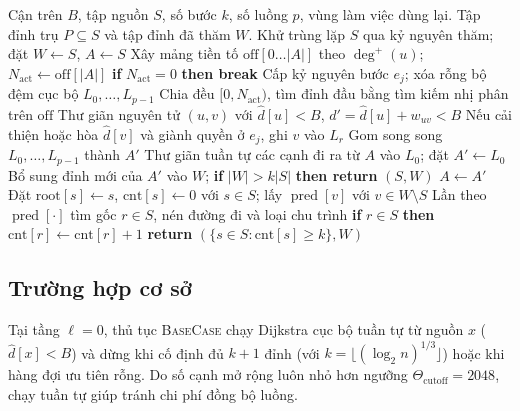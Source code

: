\begin{algorithm}[htbp]
\caption{Thủ tục tìm đỉnh trụ song song $\textsc{FindPivots}(B, S, k)$}
\label{alg:parallel_find_pivots}
\small\setlength{\baselineskip}{14pt}
\begin{algorithmic}[1]
\Require Cận trên $B$, tập nguồn $S$, số bước $k$, số luồng $p$, vùng làm việc dùng lại.
\Ensure Tập đỉnh trụ $P \subseteq S$ và tập đỉnh đã thăm $W$.
\State Khử trùng lặp $S$ qua kỷ nguyên thăm; đặt $W \leftarrow S$, $A \leftarrow S$
    \State Xây mảng tiền tố $\mathrm{off}[0\ldots|A|]$ theo $\deg^+(u)$; $N_{\mathrm{act}} \leftarrow \mathrm{off}[|A|]$
    \State \textbf{if} $N_{\mathrm{act}} = 0$ \textbf{then break}
    \State Cấp kỷ nguyên bước $e_j$; xóa rỗng bộ đệm cục bộ $L_0, \ldots, L_{p-1}$
            \State Chia đều $[0, N_{\mathrm{act}})$, tìm đỉnh đầu bằng tìm kiếm nhị phân trên $\mathrm{off}$
            \State Thư giãn nguyên tử $(u, v)$ với $\widehat{d}[u] < B$, $d' = \widehat{d}[u] + w_{uv} < B$
            \State Nếu cải thiện hoặc hòa $\widehat{d}[v]$ và giành quyền ở $e_j$, ghi $v$ vào $L_r$
        \EndFor
        \State Gom song song $L_0, \ldots, L_{p-1}$ thành $A'$
    \Else
        \State Thư giãn tuần tự các cạnh đi ra từ $A$ vào $L_0$; đặt $A' \leftarrow L_0$
    \EndIf
    \State Bổ sung đỉnh mới của $A'$ vào $W$; \textbf{if} $|W| > k|S|$ \textbf{then return} $(S, W)$
    \State $A \leftarrow A'$
\EndFor
\State Đặt $\mathrm{root}[s] \leftarrow s$, $\mathrm{cnt}[s] \leftarrow 0$ với $s \in S$; lấy $\operatorname{pred}[v]$ với $v \in W \setminus S$
 
    \State Lần theo $\operatorname{pred}[\cdot]$ tìm gốc $r \in S$, nén đường đi và loại chu trình
    \State \textbf{if} $r \in S$ \textbf{then} $\mathrm{cnt}[r] \leftarrow \mathrm{cnt}[r] + 1$
\EndFor
\State \textbf{return} $(\{s \in S : \mathrm{cnt}[s] \ge k\}, W)$
\end{algorithmic}
\end{algorithm}

\subsection{Trường hợp cơ sở}\label{subsec:c2-base-case}

Tại tầng $\ell = 0$, thủ tục \textsc{BaseCase} chạy Dijkstra cục bộ tuần tự từ nguồn $x$ ($\widehat{d}[x] < B$) và dừng khi cố định đủ $k + 1$ đỉnh (với $k = \lfloor (\log_2 n)^{1/3} \rfloor$) hoặc khi hàng đợi ưu tiên rỗng. Do số cạnh mở rộng luôn nhỏ hơn ngưỡng $\Theta_{\mathrm{cutoff}} = 2048$, chạy tuần tự giúp tránh chi phí đồng bộ luồng.

